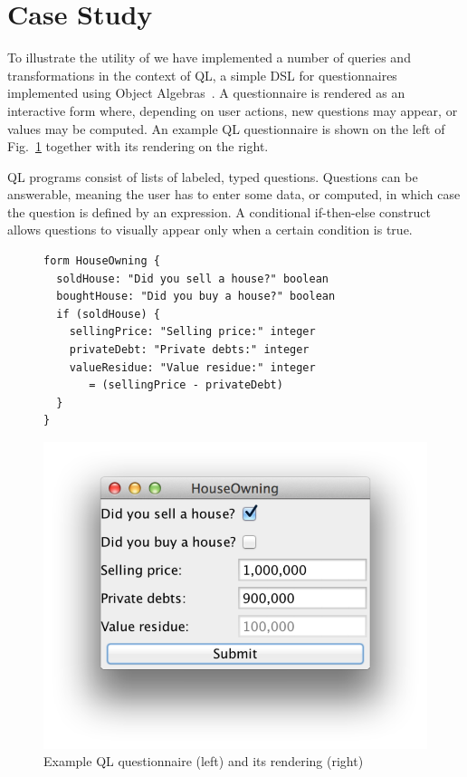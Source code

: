 \section{Case Study}

To illustrate the utility of \name we have implemented a number of queries and transformations in the context of QL, a simple DSL for questionnaires implemented using Object Algebras~\cite{gouseti14extensible}.
A questionnaire is rendered as an interactive form where, depending on user actions, new questions may appear, or values may be computed.
An example QL questionnaire is shown on the left of Fig.~\ref{FIG:houseowning} together with its rendering on the right.

QL programs consist of lists of labeled, typed questions.
Questions can be answerable, meaning the user has to enter some data, or computed, in which case the question is defined by an expression.
A conditional if-then-else construct allows questions to visually appear only when a certain condition is true.

\begin{figure}[t]
\nocaptionrule
\hspace*{-5pt}\begin{minipage}{0.6\linewidth}
\begin{lstlisting}[language=ql]
form HouseOwning {
  soldHouse: "Did you sell a house?" boolean
  boughtHouse: "Did you buy a house?" boolean
  if (soldHouse) {
    sellingPrice: "Selling price:" integer
    privateDebt: "Private debts:" integer
    valueResidue: "Value residue:" integer
       = (sellingPrice - privateDebt)
  }
}
\end{lstlisting}
\end{minipage}
\begin{minipage}{0.5\linewidth}
  \includegraphics[width=\linewidth]{sections/screenshot}
\end{minipage}
\caption{Example QL questionnaire (left) and its rendering (right)}
\label{FIG:houseowning}
\end{figure}

